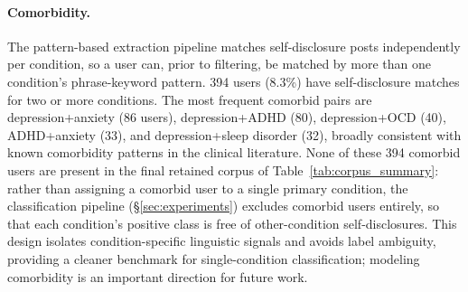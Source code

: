 \documentclass[letterpaper]{article} %
\begin{document}
\paragraph{Comorbidity.} The pattern-based extraction pipeline matches self-disclosure posts independently per condition,
so a user can, prior to filtering, be matched by more than one condition's phrase-keyword pattern.
394 users (8.3\%) have self-disclosure matches for two or more conditions.
The most frequent comorbid pairs are depression+anxiety (86 users), depression+ADHD (80), depression+OCD (40), ADHD+anxiety (33), and depression+sleep disorder (32), broadly consistent with known comorbidity patterns in the clinical literature. None of these 394 comorbid users are present in the final retained corpus of Table~\ref{tab:corpus_summary}: rather than assigning a comorbid user to a single primary condition, the classification pipeline (§\ref{sec:experiments}) excludes comorbid users entirely, so that each condition's positive class is free of other-condition self-disclosures. This design isolates condition-specific linguistic signals and avoids label ambiguity, providing a cleaner benchmark for single-condition classification; modeling comorbidity is an important direction for future work.
\end{document}
